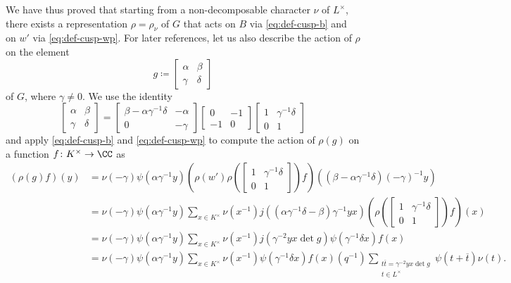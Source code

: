 \documentclass[../main.tex]{subfiles}
\begin{document}
We have thus proved that starting from a non-decomposable character $\nu$ of $L^\times$, there exists a representation $\rho=\rho_\nu$ of $G$ that acts on $B$ via \eqref{eq:def-cusp-b} and on $w'$ via \eqref{eq:def-cusp-wp}. For later references, let us also describe the action of $\rho$ on the element
\begin{equation}
	g\coloneqq\begin{bmatrix}
		\alpha & \beta \\
		\gamma & \delta
	\end{bmatrix} \label{eq:g-notin-b}
\end{equation}
of $G$, where $\gamma\ne0$. We use the identity
\[\begin{bmatrix}
	\alpha & \beta \\
	\gamma & \delta
\end{bmatrix}=\begin{bmatrix}
	\beta-\alpha\gamma^{-1}\delta & -\alpha \\
	0 & -\gamma
\end{bmatrix}\begin{bmatrix}
	0 & -1 \\
	-1 & 0
\end{bmatrix}\begin{bmatrix}
	1 & \gamma^{-1}\delta \\
	0 & 1
\end{bmatrix}\]
and apply \eqref{eq:def-cusp-b} and \eqref{eq:def-cusp-wp} to compute the action of $\rho(g)$ on a function $f\colon K^\times\to\CC$ as
\begin{align*}
	(\rho(g)f)(y) &= \nu(-\gamma)\psi\left(\alpha\gamma^{-1}y\right)\left(\rho(w')\rho\left(\begin{bmatrix}
		1 & \gamma^{-1}\delta \\
		0 & 1
	\end{bmatrix}\right)f\right)\left(\left(\beta-\alpha\gamma^{-1}\delta\right)(-\gamma)^{-1}y\right) \\
	&= \nu(-\gamma)\psi\left(\alpha\gamma^{-1}y\right)\sum_{x\in K^\times}\nu\left(x^{-1}\right)j\left(\left(\alpha\gamma^{-1}\delta-\beta\right)\gamma^{-1}yx\right)\left(\rho\left(\begin{bmatrix}
		1 & \gamma^{-1}\delta \\
		0 & 1
	\end{bmatrix}\right)f\right)(x) \\
	&= \nu(-\gamma)\psi\left(\alpha\gamma^{-1}y\right)\sum_{x\in K^\times}\nu\left(x^{-1}\right)j\left(\gamma^{-2}yx\det g\right)\psi\left(\gamma^{-1}\delta x\right)f(x) \\
	&= \nu(-\gamma)\psi\left(\alpha\gamma^{-1}y\right)\sum_{x\in K^\times}\nu\left(x^{-1}\right)\psi\left(\gamma^{-1}\delta x\right)f(x)\left(q^{-1}\right)\sum_{\substack{t\overline t=\gamma^{-2}yx\det g\\t\in L^\times}}\psi\left(t+\overline t\right)\nu(t).
\end{align*}
\end{document}
